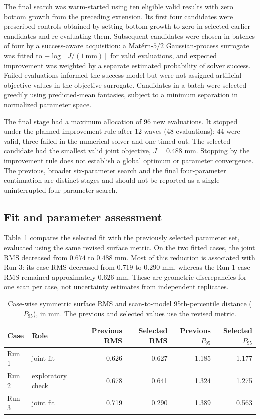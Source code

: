 \documentclass[11pt]{article}
\begin{document}
The final search was warm-started using ten eligible valid results with zero bottom growth from the preceding extension. Its first four candidates were prescribed controls obtained by setting bottom growth to zero in selected earlier candidates and re-evaluating them. Subsequent candidates were chosen in batches of four by a success-aware acquisition: a Mat\'ern-$5/2$ Gaussian-process surrogate was fitted to $-\log[J/(1\,\mathrm{mm})]$ for valid evaluations, and expected improvement was weighted by a separate estimated probability of solver success. Failed evaluations informed the success model but were not assigned artificial objective values in the objective surrogate. Candidates in a batch were selected greedily using predicted-mean fantasies, subject to a minimum separation in normalized parameter space.

The final stage had a maximum allocation of 96 new evaluations. It stopped under the planned improvement rule after 12 waves (48 evaluations): 44 were valid, three failed in the numerical solver and one timed out. The selected candidate had the smallest valid joint objective, $J=0.488$ mm. Stopping by the improvement rule does not establish a global optimum or parameter convergence. The previous, broader six-parameter search and the final four-parameter continuation are distinct stages and should not be reported as a single uninterrupted four-parameter search.

\subsection{Fit and parameter assessment}
Table~\ref{tab:fits} compares the selected fit with the previously selected parameter set, evaluated using the same revised surface metric. On the two fitted cases, the joint RMS decreased from $0.674$ to $0.488$ mm. Most of this reduction is associated with Run 3: its case RMS decreased from $0.719$ to $0.290$ mm, whereas the Run 1 case RMS remained approximately $0.626$ mm. These are geometric discrepancies for one scan per case, not uncertainty estimates from independent replicates.

\begin{table}[ht]
\centering
\caption{Case-wise symmetric surface RMS and scan-to-model 95th-percentile distance ($P_{95}$), in mm. The previous and selected values use the revised metric.}
\label{tab:fits}
\begin{tabular}{llrrrr}\toprule
Case & Role & Previous RMS & Selected RMS & Previous $P_{95}$ & Selected $P_{95}$ \\\midrule
Run 1 & joint fit & 0.626 & 0.627 & 1.185 & 1.177 \\
Run 2 & exploratory check & 0.678 & 0.641 & 1.324 & 1.275 \\
Run 3 & joint fit & 0.719 & 0.290 & 1.389 & 0.563 \\\bottomrule
\end{tabular}
\end{table}
\end{document}
